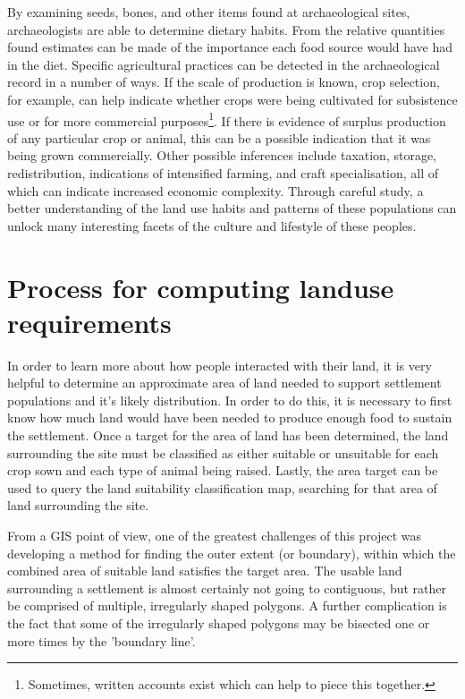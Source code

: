 By examining seeds, bones, and other items found at archaeological sites,
archaeologists are able to determine dietary habits. From the relative
quantities found estimates can be made of the importance each food source would
have had in the diet.  Specific agricultural practices can be detected in the
archaeological record in a number of ways.  If the scale of production is
known, crop selection, for example, can help indicate whether crops were being
cultivated for subsistence use or for more commercial
purposes\footnote{Sometimes, written accounts exist which can help to piece
this together.}.  If there is evidence of surplus production of any particular
crop or animal, this can be a possible indication that it was being grown
commercially.  Other possible inferences include taxation, storage,
redistribution, indications of intensified farming, and craft specialisation,
all of which can indicate increased economic complexity.  Through careful
study, a better understanding of the land use habits and patterns of these
populations can unlock many interesting facets of the culture and lifestyle of
these peoples.

\section{Process for computing landuse requirements} \label{sec:EarlyAttempts} 

In order to learn more about how people interacted with their land, it is very
helpful to determine an approximate area of land needed to support settlement
populations and it's likely distribution.  In order to do this, it is necessary
to first know how much land would have been needed to produce enough food to
sustain the settlement.  Once a target for the area of land has been
determined, the land surrounding the site must be classified as either suitable
or unsuitable for each crop sown and each type of animal being raised.  Lastly,
the area target can be used to query the land suitability classification map,
searching for that area of land surrounding the site.

From a GIS point of view, one of the greatest challenges of this project was
developing a method for finding the outer extent (or boundary), within which
the combined area of suitable land satisfies the target area.  The usable land
surrounding a settlement is almost certainly not going to contiguous, but
rather be comprised of multiple, irregularly shaped polygons. A further
complication is the fact that some of the irregularly shaped polygons may
be bisected one or more times by the 'boundary line'.  

